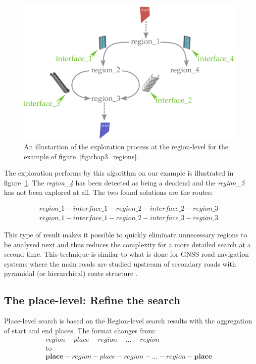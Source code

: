 \begin{figure}[ht!]
\centering
\includegraphics[scale=0.12]{figures/chapter3/Region_exploration_graph.png}
\caption{\label{fig:chap3_region_expl} An illustartion of the exploration process at the region-level for the example of figure~\ref{fig:chap3_regions}.}
\end{figure}

The exploration performs by this algorithm on our example is illustrated in figure~\ref{fig:chap3_region_expl}. The \textit{region\_4} has been detected as being a deadend and the \textit{region\_5} has not been explored at all. The two found solutions are the routes:

\begin{align*}
region\_1 - interface\_1 - region\_2 - interface\_2 - region\_3 \\
region\_1 - interface\_1 - region\_2 - interface\_3 - region\_3
\end{align*}

This type of result makes it possible to quickly eliminate unnecessary regions to be analysed next and thus reduces the complexity for a more detailed search at a second time. This technique is similar to what is done for GNSS road navigation systems where the main roads are studied upstream of secondary roads with pyramidal (or hierarchical) route structure \cite{bovy_2012_route}.

\subsection{The place-level: Refine the search}

Place-level search is based on the Region-level search results with the aggregation of start and end places. The format changes from:
\begin{gather*}
region - place - region - ... - region \\
\text{to} \\
\textbf{place} - region - place - region - ... - region - \textbf{place}
\end{gather*}

